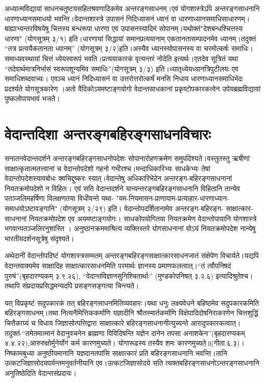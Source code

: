 {अध्यात्मविद्यायां साधनचतुष्टयसहितश्रवणादिकमेव अन्तरङ्गसाधनम्।एवं योगशास्त्रेऽपि अन्तरङ्गसाधनानि धारणाध्यानसमाधयो भवन्ति।वेदान्तशास्त्रे उपासनं निदिध्यासनं ध्यानं वा धारणाध्यानसमाधिसाधारणम्। बाह्याभ्यन्तरविषयेषु चित्तस्य बन्धरूपा धारणा एव उपासनस्यादिमं सोपानम्।यथोक्तं"देशबन्धश्चित्तस्य धारणा" (योगसूत्रम् ३/१) इति।धारणायां सिद्धायां समानप्रत्ययानाम् एकतानतासम्पादनमेव ध्यानम्।तदुक्तं “तत्र प्रत्ययैकतानता ध्यानम्” (योगसूत्रम् ३/२)इति।अस्यैव ध्यानस्योपासनस्य वा चरमोत्कर्षः समाधिः।समाध्यवस्थायां चित्तं ध्येयस्वरूपं भवति।प्रत्ययाकारकं वृत्यन्तरं नोदेति इत्यर्थः।एतदेव सूत्रितं यथा “तदेवार्थमात्रनिर्भासं स्वरूपशून्यमिव समाधिः”(योगसूत्रम् ३/३) इति।ध्यातृध्येयध्यानत्रिपुटीलयः एव समाधिशब्दवाच्यः। एवञ्च ध्यानं निदिध्यासनं वा उत्तरोत्तरोत्कर्षं मनसि निधाय धारणाध्यानसमाधिभेदः प्रदर्श्यते योगसूत्रकारेण ।अतो वैदिकोऽयमष्टाङ्गयोगो वेदान्तसाधकानां प्रकृष्टोपकारकत्वेन उपेयब्रह्मविद्यायां पुष्कलोपायभावं भजते।

\section*{वेदान्तदिशा अन्तरङ्गबहिरङ्गसाधनविचारः}

सनातनवेदान्तदर्शने अन्तरङ्गबहिरङ्गसाधनोपदेशः सोपानारोहणक्रमेण समुपदिश्यते।वस्तुतस्तु ऋषीणां साक्षात्कृतात्मतत्त्वानां च वेदान्तोपदेशो गहनो गभीरश्च।मन्दाधिकारिभ्यः साधकेभ्यः तेषां वेदान्तोपदेशस्यावबोधः क्वचिद्दुष्करः स्यात्।वेदान्तेषु अधिकारिभेदेन अन्तरङ्ग-बहिरङ्गसाधनानां नियतक्रमोपदेशो न विहितः। एवं सति वेदान्तदर्शने यान्यन्तरङ्गबहिरङ्गसाधनानि विहितानि तान्येव पतञ्जलिमहर्षिणा विलक्षणतया विधीयन्ते यथा- "यम-नियमासन-प्राणायाम-प्रत्याहार-धारणाध्यान- समाधयोऽष्टावङ्गानि" (योगसूत्रम् २/२९) इति। वेदान्तोपदर्शितानामेव अन्तरङ्ग-बहिरङ्ग- साक्षात्कार-साधनानां नियतक्रमोपदेश एव अयमष्टाङ्गयोगः। साधकोपयोगितया नियतक्रमेण वेदान्तोपायानि योगशास्त्रे भगवान्पतञ्जलिरनुशास्ति । अनुष्ठानक्रममाश्रित्य व्यक्तिस्तरे योगसाधनानां योऽयं नियतक्रमोपदेश नान्येषु भारतीयदर्शनसूत्रेषु संदृश्यते।

अथेदानीं वेदान्तोपदिष्टं योगशास्त्रसम्मतम् अन्तरङ्गबहिरङ्गसाक्षात्कारसाधनजातं संक्षेपेण विचार्यते।यद्यपि वेदान्तवाक्यमेव साक्षादिह साक्षात्कारसाधनमिति परमार्थः ज्ञानस्य प्रमाणफलत्वात्।“तं त्वौपनिषदं पुरुषं”(बृहदारण्यकम् ३.९.२६), “वेदान्तविज्ञानसुनिश्चितार्थाः” (मुण्डकोपनिषत् ३.२.६) इत्यादिश्रुतेश्च। तथापि संप्रदायप्रसिद्धमन्यदपि प्रसङ्गसङ्गत्या चिन्त्यते।

यत् विप्रकृष्टं सदुपकारकं तत् बहिरङ्गसाधनमितिव्यवहारः।यथा धनुः लक्ष्यवेधने बहिष्ठमेव सदुपकारकमिति बहिरङ्गसाधनम्।तथा नित्यनैमित्तिककर्माणि यज्ञादीनि श्रौतस्मार्तकर्माणि विक्षेपादिदोषनिराकरणेन चित्तशुद्धिं चित्तैकाग्र्यं च विधाय जिज्ञासोत्पत्तिद्वारा साक्षात्कारे बहिरङ्गसाधनानीत्युच्यन्ते आरादुपकारकत्वात्। तदुक्तं-“तमेतमात्मानं वेदानुवचनेन ब्राह्मणा विविदिषन्ति यज्ञेन दानेन तपसा अनाशकेन”(बृहदारण्यकम् ४.४.२२),आरुरुक्षोर्मुनेर्योगं कर्म कारणमुच्यते। योगारूढस्य तस्यैव शमः कारणमुच्यते॥(गीता.६.३)। निष्कामबुध्या अनुष्ठीयमानानि यज्ञदानतपांसि साक्षात्कारं प्रति बहिरङ्गसाधनानि भवन्ति।तानि उत्कटजिज्ञासोदयपर्यन्तमनुवर्तनीयानि एव।उत्कटजिज्ञासोदये सति त्यक्तबहिरङ्गसाधनोऽन्तरङ्गसाधनानि अनुतिष्ठेदिति वेदान्तसंप्रदायः।

}

